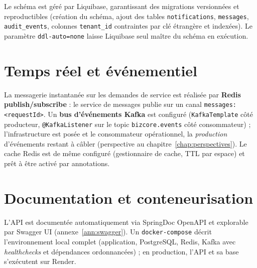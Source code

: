 Le schéma est géré par Liquibase, garantissant des migrations versionnées et reproductibles
(création du schéma, ajout des tables \texttt{notifications}, \texttt{messages},
\texttt{audit\_events}, colonnes \texttt{tenant\_id} contraintes par clé étrangère et
indexées). Le paramètre \texttt{ddl-auto=none} laisse Liquibase seul maître du schéma en
exécution.

\section{Temps réel et événementiel}

La messagerie instantanée sur les demandes de service est réalisée par \textbf{Redis
publish/subscribe} : le service de messages publie sur un canal
\texttt{messages:<requestId>}. Un \textbf{bus d'événements Kafka} est configuré
(\texttt{KafkaTemplate} côté producteur, \texttt{@KafkaListener} sur le topic
\texttt{bizcore.events} côté consommateur) ; l'infrastructure est posée et le consommateur
opérationnel, la \emph{production} d'événements restant à câbler (perspective au
chapitre~\ref{chap:perspectives}). Le cache Redis est de même configuré (gestionnaire de
cache, TTL par espace) et prêt à être activé par annotations.

\section{Documentation et conteneurisation}

L'API est documentée automatiquement via SpringDoc OpenAPI et explorable par Swagger UI
(annexe~\ref{ann:swagger}). Un \texttt{docker-compose} décrit l'environnement local complet
(application, PostgreSQL, Redis, Kafka avec \emph{healthchecks} et dépendances
ordonnancées) ; en production, l'API et sa base s'exécutent sur Render.
